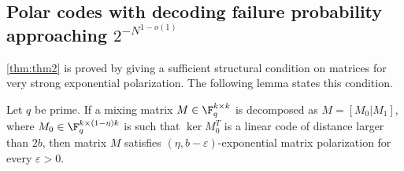 \documentclass[11pt]{article}
\begin{document}
\subsection{Polar codes with decoding failure probability approaching $2^{-N^{1-o(1)}}$}
\label{sec:strong-exp-failure}

\cref{thm:thm2} is proved by giving a sufficient structural condition on matrices for very strong exponential polarization. The following lemma states this condition.

\begin{lemma}
	\label{lem:code-exp-suction} Let $q$ be prime.
	If a mixing matrix $M\in \F_q^{k\times k}$ is decomposed as $M = \left[ M_0 | M_1 \right]$, where $M_0 \in \F_q^{k \times (1 - \eta) k}$ is such that $\ker M_0^T$ is a linear code of distance larger than $2 b$, then matrix $M$ satisfies $(\eta, b - \varepsilon)$-exponential matrix polarization for every $\varepsilon > 0$.
\end{lemma}
\end{document}
